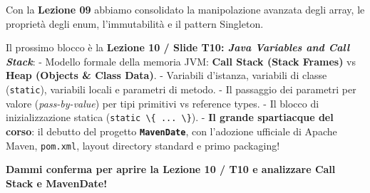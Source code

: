 \documentclass[11pt,a4paper]{article}
\newcommand{\passthrough}[1]{#1}
\begin{document}
\begin{studynote} Con la \textbf{Lezione 09} abbiamo consolidato la
manipolazione avanzata degli array, le proprietà degli enum,
l'immutabilità e il pattern Singleton.

Il prossimo blocco è la \textbf{Lezione 10 / Slide T10: \emph{Java
Variables and Call Stack}}: - Modello formale della memoria JVM:
\textbf{Call Stack (Stack Frames)} vs \textbf{Heap (Objects \& Class
Data)}. - Variabili d'istanza, variabili di classe
(\passthrough{\lstinline!static!}), variabili locali e parametri di
metodo. - Il passaggio dei parametri per valore (\emph{pass-by-value})
per tipi primitivi vs reference types. - Il blocco di inizializzazione
statica (\passthrough{\lstinline!static \{ ... \}!}). - \textbf{Il
grande spartiacque del corso}: il debutto del progetto
\textbf{\passthrough{\lstinline!MavenDate!}}, con l'adozione ufficiale
di Apache Maven, \passthrough{\lstinline!pom.xml!}, layout directory
standard e primo packaging!
\end{studynote}

\textbf{Dammi conferma per aprire la Lezione 10 / T10 e analizzare Call
Stack e MavenDate!}
\end{document}
